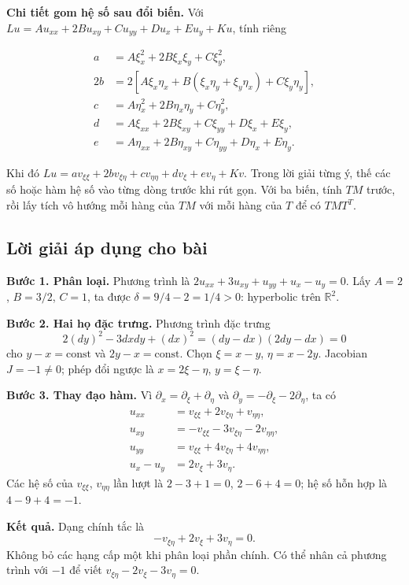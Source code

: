 \documentclass[10pt,a4paper]{article}
\begin{document}
\textbf{Chi tiết gom hệ số sau đổi biến.} Với $Lu=Au_{xx}+2Bu_{xy}+Cu_{yy}+Du_x+Eu_y+Ku$, tính riêng


\[
\begin{aligned}
a&=A\xi_x^2+2B\xi_x\xi_y+C\xi_y^2,\\
2b&=2[A\xi_x\eta_x+B(\xi_x\eta_y+\xi_y\eta_x)+C\xi_y\eta_y],\\
c&=A\eta_x^2+2B\eta_x\eta_y+C\eta_y^2,\\
d&=A\xi_{xx}+2B\xi_{xy}+C\xi_{yy}+D\xi_x+E\xi_y,\\
e&=A\eta_{xx}+2B\eta_{xy}+C\eta_{yy}+D\eta_x+E\eta_y.
\end{aligned}
\]


Khi đó $Lu=av_{\xi\xi}+2bv_{\xi\eta}+cv_{\eta\eta}+dv_\xi+ev_\eta+Kv$. Trong lời giải từng ý, thế các số hoặc hàm hệ số vào từng dòng trước khi rút gọn. Với ba biến, tính $TM$ trước, rồi lấy tích vô hướng mỗi hàng của $TM$ với mỗi hàng của $T$ để có $TMT^T$.
\subsection*{Lời giải áp dụng cho bài}
\textbf{Bước 1. Phân loại.} Phương trình là $2u_{xx}+3u_{xy}+u_{yy}+u_x-u_y=0$. Lấy $A=2$, $B=3/2$, $C=1$, ta được $\delta=9/4-2=1/4>0$: hyperbolic trên $\mathbb R^2$.

\textbf{Bước 2. Hai họ đặc trưng.} Phương trình đặc trưng
\[2(dy)^2-3dxdy+(dx)^2=(dy-dx)(2dy-dx)=0\]
cho $y-x=\mathrm{const}$ và $2y-x=\mathrm{const}$. Chọn $\xi=x-y$, $\eta=x-2y$. Jacobian $J=-1\ne0$; phép đổi ngược là $x=2\xi-\eta$, $y=\xi-\eta$.

\textbf{Bước 3. Thay đạo hàm.} Vì $\partial_x=\partial_\xi+\partial_\eta$ và $\partial_y=-\partial_\xi-2\partial_\eta$, ta có
\begin{align*}
u_{xx}&=v_{\xi\xi}+2v_{\xi\eta}+v_{\eta\eta},\\
u_{xy}&=-v_{\xi\xi}-3v_{\xi\eta}-2v_{\eta\eta},\\
u_{yy}&=v_{\xi\xi}+4v_{\xi\eta}+4v_{\eta\eta},\\
u_x-u_y&=2v_\xi+3v_\eta.
\end{align*}
Các hệ số của $v_{\xi\xi}$, $v_{\eta\eta}$ lần lượt là $2-3+1=0$, $2-6+4=0$; hệ số hỗn hợp là $4-9+4=-1$.

\textbf{Kết quả.} Dạng chính tắc là
\[\boxed{-v_{\xi\eta}+2v_\xi+3v_\eta=0.}\]
Không bỏ các hạng cấp một khi phân loại phần chính. Có thể nhân cả phương trình với $-1$ để viết $v_{\xi\eta}-2v_\xi-3v_\eta=0$.
\end{document}
